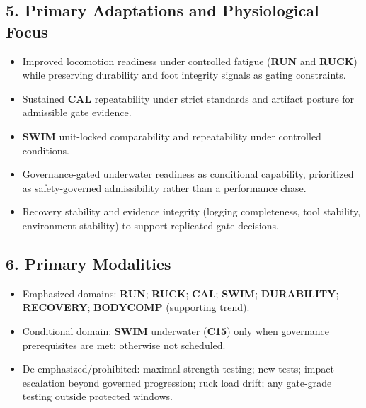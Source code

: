 \documentclass[10pt]{article}
\begin{document}
\subsection*{5. Primary Adaptations and Physiological Focus}

\begin{itemize}
\item Improved locomotion readiness under controlled fatigue (\textbf{RUN} and \textbf{RUCK}) while preserving durability and foot integrity signals as gating constraints.
\item Sustained \textbf{CAL} repeatability under strict standards and artifact posture for admissible gate evidence.
\item \textbf{SWIM} unit-locked comparability and repeatability under controlled conditions.
\item Governance-gated underwater readiness as conditional capability, prioritized as safety-governed admissibility rather than a performance chase.
\item Recovery stability and evidence integrity (logging completeness, tool stability, environment stability) to support replicated gate decisions.
\end{itemize}

\subsection*{6. Primary Modalities}

\begin{itemize}
\item Emphasized domains: \textbf{RUN}; \textbf{RUCK}; \textbf{CAL}; \textbf{SWIM}; \textbf{DURABILITY}; \textbf{RECOVERY}; \textbf{BODYCOMP} (supporting trend).
\item Conditional domain: \textbf{SWIM} underwater (\textbf{C15}) only when governance prerequisites are met; otherwise not scheduled.
\item De-emphasized/prohibited: maximal strength testing; new tests; impact escalation beyond governed progression; ruck load drift; any gate-grade testing outside protected windows.
\end{itemize}
\end{document}
